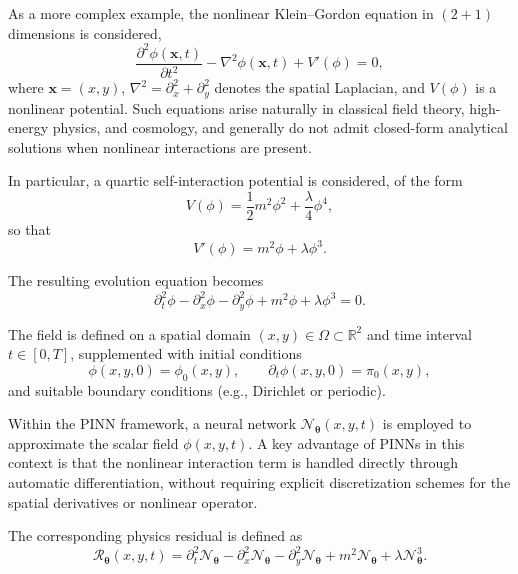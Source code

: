 As a more complex example, the nonlinear Klein--Gordon equation in $(2+1)$ dimensions is considered,
\begin{equation}
    \frac{\partial^2 \phi(\mathbf{x},t)}{\partial t^2}
    - \nabla^2 \phi(\mathbf{x},t)
    + V'(\phi) = 0,
\end{equation}
where $\mathbf{x} = (x,y)$, $\nabla^2 = \partial_x^2 + \partial_y^2$ denotes the spatial Laplacian, and $V(\phi)$ is a nonlinear potential. 
Such equations arise naturally in classical field theory, high-energy physics, and cosmology, and generally do not admit closed-form analytical solutions when nonlinear interactions are present.

In particular, a quartic self-interaction potential is considered, of the form
\begin{equation}
    V(\phi) = \frac{1}{2} m^2 \phi^2 + \frac{\lambda}{4} \phi^4,
\end{equation}
so that
\begin{equation}
    V'(\phi) = m^2 \phi + \lambda \phi^3.
\end{equation}

The resulting evolution equation becomes
\begin{equation}
    \partial_t^2 \phi
    - \partial_x^2 \phi
    - \partial_y^2 \phi
    + m^2 \phi
    + \lambda \phi^3
    = 0.
\end{equation}

The field is defined on a spatial domain $(x,y) \in \Omega \subset \mathbb{R}^2$ and time interval $t \in [0,T]$, supplemented with initial conditions
\begin{equation}
    \phi(x,y,0) = \phi_0(x,y),
    \qquad
    \partial_t \phi(x,y,0) = \pi_0(x,y),
\end{equation}
and suitable boundary conditions (e.g., Dirichlet or periodic).

Within the PINN framework, a neural network $\mathcal{N}_{\boldsymbol{\theta}}(x,y,t)$ is employed to approximate the scalar field $\phi(x,y,t)$. 
A key advantage of PINNs in this context is that the nonlinear interaction term is handled directly through automatic differentiation, without requiring explicit discretization schemes for the spatial derivatives or nonlinear operator.

The corresponding physics residual is defined as
\begin{equation}
    \mathcal{R}_{\boldsymbol{\theta}}(x,y,t)
    =
    \partial_t^2 \mathcal{N}_{\boldsymbol{\theta}}
    -
    \partial_x^2 \mathcal{N}_{\boldsymbol{\theta}}
    -
    \partial_y^2 \mathcal{N}_{\boldsymbol{\theta}}
    +
    m^2 \mathcal{N}_{\boldsymbol{\theta}}
    +
    \lambda \mathcal{N}_{\boldsymbol{\theta}}^3.
\end{equation}

